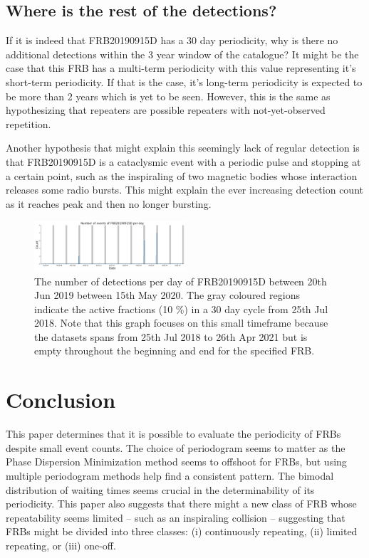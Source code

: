 \documentclass[reprint,amsmath,amssymb,showkeys,prd]{revtex4-2}
\begin{document}
\subsection{Where is the rest of the detections?}\label{sec-why-30}

If it is indeed that FRB20190915D has a 30 day periodicity, why is there no additional detections within the 3 year window of the catalogue?
It might be the case that this FRB has a multi-term periodicity with this value representing it's short-term periodicity.
If that is the case, it's long-term periodicity is expected to be more than 2 years which is yet to be seen.
However, this is the same as hypothesizing that repeaters are possible repeaters with not-yet-observed repetition.

Another hypothesis that might explain this seemingly lack of regular detection is that FRB20190915D is a cataclysmic event with a periodic pulse and stopping at a certain point, such as the inspiraling of two magnetic bodies whose interaction releases some radio bursts.
This might explain the ever increasing detection count as it reaches peak and then no longer bursting.

\begin{figure}[ht]
    \label{fig-FRB20190915D-countplot}
    \caption{The number of detections per day of FRB20190915D between 20th Jun 2019 between 15th May 2020. The gray coloured regions indicate the active fractions (10 \%) in a 30 day cycle from 25th Jul 2018. Note that this graph focuses on this small timeframe because the datasets spans from 25th Jul 2018 to 26th Apr 2021 but is empty throughout the beginning and end for the specified FRB.}
    \centering
    \includegraphics[width=0.5\textwidth]{./FRB20190915D-countplot.png}
\end{figure}

\section{Conclusion}

This paper determines that it is possible to evaluate the periodicity of FRBs despite small event counts.
The choice of periodogram seems to matter as the Phase Dispersion Minimization method seems to offshoot for FRBs, but using multiple periodogram methods help find a consistent pattern. 
The bimodal distribution of waiting times seems crucial in the determinability of its periodicity.
This paper also suggests that there might a new class of FRB whose repeatability seems limited -- such as an inspiraling collision -- suggesting that FRBs might be divided into three classes: (i) continuously repeating, (ii) limited repeating, or (iii) one-off.
\end{document}
